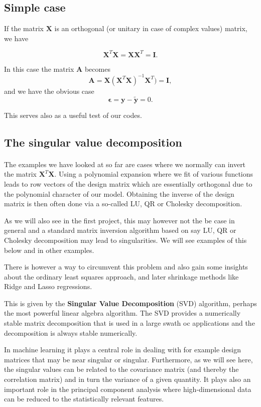 \documentclass[%
oneside,                 %
final,                   %
10pt]{article}
\begin{document}
\subsection{Simple case}

If the matrix $\bm{X}$ is an orthogonal (or unitary in case of complex values) matrix, we have

\[
\bm{X}^T\bm{X}=\bm{X}\bm{X}^T = \bm{I}.
\]

In this case the matrix $\bm{A}$ becomes
\[
\bm{A}=\bm{X}\left(\bm{X}^T\bm{X}\right)^{-1}\bm{X}^T)=\bm{I},
\]
and we have the obvious case
\[
\bm{\epsilon}=\bm{y}-\tilde{\bm{y}}=0.
\]

This serves also as a useful test of our codes. 

\subsection{The singular value decomposition}


\paragraph{}

The examples we have looked at so far are cases where we normally can
invert the matrix $\bm{X}^T\bm{X}$. Using a polynomial expansion where we fit of various functions leads to
row vectors of the design matrix which are essentially orthogonal due
to the polynomial character of our model. Obtaining the inverse of the
design matrix is then often done via a so-called LU, QR or Cholesky
decomposition.

As we will also see in the first project, 
this may
however not the be case in general and a standard matrix inversion
algorithm based on say LU, QR or Cholesky decomposition may lead to singularities. We will see examples of this below and in other examples.

There is however a way to circumvent this problem and also
gain some insights about the ordinary least squares approach, and
later shrinkage methods like Ridge and Lasso regressions.

This is given by the \textbf{Singular Value Decomposition} (SVD) algorithm,
perhaps the most powerful linear algebra algorithm.  The SVD provides
a numerically stable matrix decomposition that is used in a large
swath oc applications and the decomposition is always stable
numerically.

In machine learning it plays a central role in dealing with for
example design matrices that may be near singular or singular.
Furthermore, as we will see here, the singular values can be related
to the covariance matrix (and thereby the correlation matrix) and in
turn the variance of a given quantity. It plays also an important role
in the principal component analysis where high-dimensional data can be
reduced to the statistically relevant features.
\end{document}
